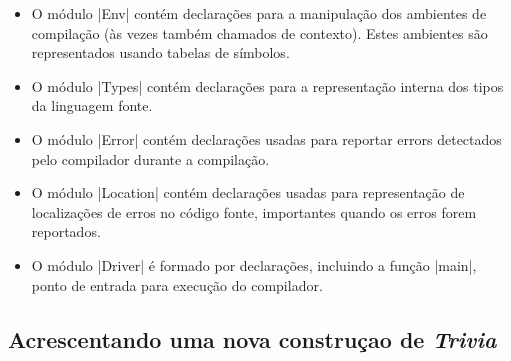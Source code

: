 \documentclass[a4paper,11pt,brazil]{article}
\newcommand{\lang}{\textsl{Trivia}}
\begin{document}
\begin{itemize}
  \item O módulo \pyginline|Env| contém declarações para a manipulação
  dos ambientes de compilação (às vezes também chamados de
  contexto). Estes ambientes são representados usando tabelas de
  símbolos.

  \item O módulo \pyginline|Types| contém declarações para a
  representação interna dos tipos da linguagem fonte.

  \item O módulo \pyginline|Error| contém declarações usadas para
  reportar errors detectados pelo compilador durante a compilação.

  \item O módulo \pyginline|Location| contém declarações usadas para
  representação de localizações de erros no código fonte, importantes
  quando os erros forem reportados.

  \item O módulo \pyginline|Driver| é formado por declarações, incluindo
  a função \pyginline|main|, ponto de entrada para execução do
  compilador.
\end{itemize}

\subsection{Acrescentando uma nova construçao de \lang{} }
\end{document}
